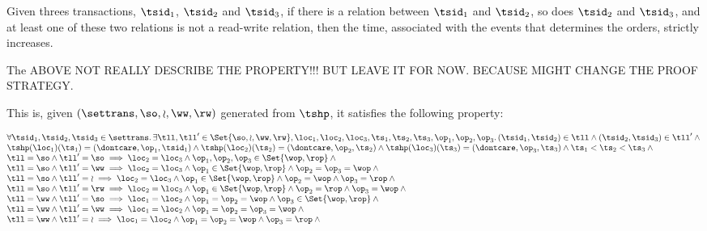 \begin{lem}
    Given threes transactions, \( \tsid_{1} \), \( \tsid_{2} \) and \( \tsid_{3} \), if there is a relation between \( \tsid_{1} \) and \( \tsid_{2} \), so does \( \tsid_{2} \) and \( \tsid_{3} \), and at least one of these two relations is not a read-write relation, then the time, associated with the events that determines the orders, strictly increases.

    The ABOVE NOT REALLY DESCRIBE THE PROPERTY!!! BUT LEAVE IT FOR NOW. BECAUSE MIGHT CHANGE THE PROOF STRATEGY.

    This is, given \( (\settrans, \so, \wr, \ww, \rw) \) generated from \( \tshp \), it satisfies the following property:
     
    \[
        \begin{array}{@{}l@{}}
            \forall \tsid_{1}, \tsid_{2},\tsid_{3} \in \settrans \ldotp \exists \tll, \tll' \in \Set{\so, \wr, \ww, \rw}, \loc_{1}, \loc_{2}, \loc_{3}, \ts_{1}, \ts_{2}, \ts_{3}, \op_{1}, \op_{2}, \op_{3} \ldotp  (\tsid_{1}, \tsid_{2}) \in \tll \land (\tsid_{2}, \tsid_{3}) \in \tll' \land {} \\
            \tshp(\loc_{1})(\ts_{1}) = (\dontcare, \op_{1}, \tsid_{1}) \land \tshp(\loc_{2})(\ts_{2}) = (\dontcare, \op_{2}, \ts_{2}) \land \tshp(\loc_{3})(\ts_{3}) = (\dontcare, \op_{3}, \ts_{3}) \land \ts_{1} < \ts_{2} < \ts_{3} \land {} \\
            \tll = \so \land \tll' = \so \implies \loc_{2} = \loc_{3} \land \op_{1}, \op_{2}, \op_{3} \in \Set{\wop, \rop} \land {} \\
            \tll = \so \land \tll' = \ww \implies \loc_{2} = \loc_{3} \land \op_{1} \in \Set{\wop, \rop} \land \op_{2} = \op_{3} = \wop \land {} \\
            \tll = \so \land \tll' = \wr \implies \loc_{2} = \loc_{3} \land \op_{1} \in \Set{\wop, \rop} \land \op_{2} = \wop \land \op_{3} = \rop \land {} \\
            \tll = \so \land \tll' = \rw \implies \loc_{2} = \loc_{3} \land \op_{1} \in \Set{\wop, \rop} \land \op_{2} = \rop \land \op_{3} = \wop \land {} \\
            \tll = \ww \land \tll' = \so \implies \loc_{1} = \loc_{2} \land \op_{1} = \op_{2} = \wop \land \op_{3} \in \Set{\wop, \rop} \land {} \\
            \tll = \ww \land \tll' = \ww \implies \loc_{1} = \loc_{2} \land \op_{1} = \op_{2} = \op_{3} = \wop \land {} \\
            \tll = \ww \land \tll' = \wr \implies \loc_{1} = \loc_{2} \land \op_{1} = \op_{2} = \wop \land \op_{3} = \rop \land {} \\

\end{array}\]
\end{lem}
